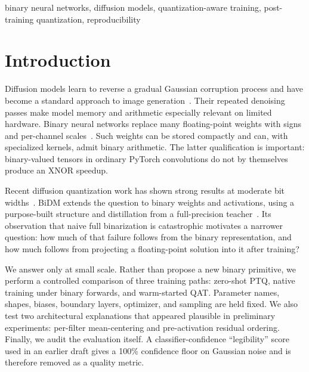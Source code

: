 \documentclass[conference]{IEEEtran}
\begin{document}
\begin{IEEEkeywords}
binary neural networks, diffusion models, quantization-aware training,
post-training quantization, reproducibility
\end{IEEEkeywords}

\section{Introduction}

Diffusion models learn to reverse a gradual Gaussian corruption process and have
become a standard approach to image generation~\cite{ho2020ddpm}. Their repeated
denoising passes make model memory and arithmetic especially relevant on limited
hardware. Binary neural networks replace many floating-point weights with signs
and per-channel scales~\cite{hubara2016bnn,rastegari2016xnornet}. Such weights can
be stored compactly and can, with specialized kernels, admit binary arithmetic.
The latter qualification is important: binary-valued tensors in ordinary PyTorch
convolutions do not by themselves produce an XNOR speedup.

Recent diffusion quantization work has shown strong results at moderate bit
widths~\cite{li2023qdiffusion,he2023ptqd}. BiDM extends the question to binary
weights and activations, using a purpose-built structure and distillation from a
full-precision teacher~\cite{bidm2024}. Its observation that naive full
binarization is catastrophic motivates a narrower question: how much of that
failure follows from the binary representation, and how much follows from
projecting a floating-point solution into it after training?

We answer only at small scale. Rather than propose a new binary primitive, we
perform a controlled comparison of three training paths: zero-shot PTQ, native
training under binary forwards, and warm-started QAT. Parameter names, shapes,
biases, boundary layers, optimizer, and sampling are held fixed. We also test two
architectural explanations that appeared plausible in preliminary experiments:
per-filter mean-centering and pre-activation residual ordering. Finally, we audit
the evaluation itself. A classifier-confidence ``legibility'' score used in an
earlier draft gives a 100\% confidence floor on Gaussian noise and is therefore
removed as a quality metric.
\end{document}
